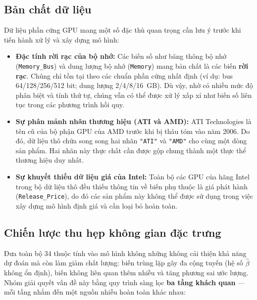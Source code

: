 \documentclass[a4paper]{article}
\begin{document}
\subsection{Bản chất dữ liệu}

Dữ liệu phần cứng GPU mang một số đặc thù quan trọng cần lưu ý trước khi tiến hành xử lý và xây dựng mô hình:

\begin{itemize}
  \item \textbf{Đặc tính rời rạc của bộ nhớ:} Các biến số như băng thông bộ nhớ (\texttt{Memory\_Bus}) và dung lượng bộ nhớ (\texttt{Memory}) mang bản chất là các biến \textbf{rời rạc}. Chúng chỉ tồn tại theo các chuẩn phần cứng nhất định (ví dụ: bus 64/128/256/512 bit; dung lượng 2/4/8/16~GB). Dù vậy, nhờ có nhiều mức độ phân biệt và tính thứ tự, chúng vẫn có thể được xử lý xấp xỉ như biến số liên tục trong các phương trình hồi quy.
  \item \textbf{Sự phân mảnh nhãn thương hiệu (ATI và AMD):} ATI Technologies là tên cũ của bộ phận GPU của AMD trước khi bị thâu tóm vào năm 2006. Do đó, dữ liệu thô chứa song song hai nhãn \texttt{"ATI"} và \texttt{"AMD"} cho cùng một dòng sản phẩm. Hai nhãn này thực chất cần được gộp chung thành một thực thể thương hiệu duy nhất.
  \item \textbf{Sự khuyết thiếu dữ liệu giá của Intel:} Toàn bộ các GPU của hãng Intel trong bộ dữ liệu thô đều thiếu thông tin về biến phụ thuộc là giá phát hành (\texttt{Release\_Price}), do đó các sản phẩm này không thể được sử dụng trong việc xây dựng mô hình định giá và cần loại bỏ hoàn toàn.
\end{itemize}

\subsection{Chiến lược thu hẹp không gian đặc trưng}

Đưa toàn bộ 34 thuộc tính vào mô hình không những không cải thiện khả năng dự đoán mà còn làm giảm chất lượng: biến trùng lặp gây đa cộng tuyến (hệ số $\hat{\beta}$ không ổn định), biến không liên quan thêm nhiễu và tăng phương sai ước lượng. Nhóm giải quyết vấn đề này bằng quy trình sàng lọc \textbf{ba tầng khách quan} --- mỗi tầng nhắm đến một nguồn nhiễu hoàn toàn khác nhau:
\end{document}
